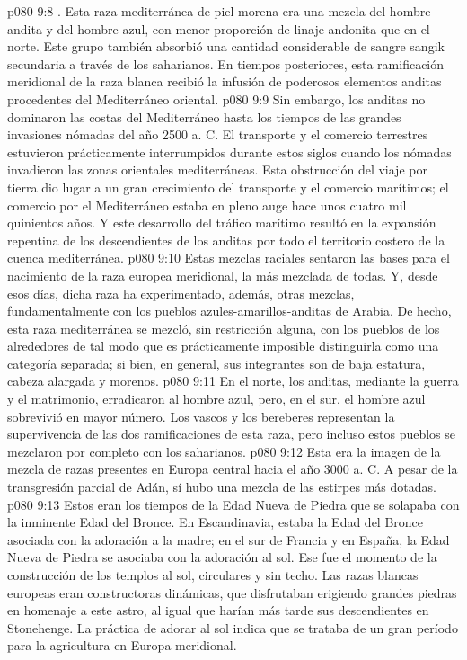 \vs p080 9:8 . Esta raza mediterránea de piel morena era una mezcla del hombre andita y del hombre azul, con menor proporción de linaje andonita que en el norte. Este grupo también absorbió una cantidad considerable de sangre sangik secundaria a través de los saharianos. En tiempos posteriores, esta ramificación meridional de la raza blanca recibió la infusión de poderosos elementos anditas procedentes del Mediterráneo oriental.
\vs p080 9:9 Sin embargo, los anditas no dominaron las costas del Mediterráneo hasta los tiempos de las grandes invasiones nómadas del año 2500 a. C. El transporte y el comercio terrestres estuvieron prácticamente interrumpidos durante estos siglos cuando los nómadas invadieron las zonas orientales mediterráneas. Esta obstrucción del viaje por tierra dio lugar a un gran crecimiento del transporte y el comercio marítimos; el comercio por el Mediterráneo estaba en pleno auge hace unos cuatro mil quinientos años. Y este desarrollo del tráfico marítimo resultó en la expansión repentina de los descendientes de los anditas por todo el territorio costero de la cuenca mediterránea.
\vs p080 9:10 Estas mezclas raciales sentaron las bases para el nacimiento de la raza europea meridional, la más mezclada de todas. Y, desde esos días, dicha raza ha experimentado, además, otras mezclas, fundamentalmente con los pueblos azules\hyp{}amarillos\hyp{}anditas de Arabia. De hecho, esta raza mediterránea se mezcló, sin restricción alguna, con los pueblos de los alrededores de tal modo que es prácticamente imposible distinguirla como una categoría separada; si bien, en general, sus integrantes son de baja estatura, cabeza alargada y morenos.
\vs p080 9:11 En el norte, los anditas, mediante la guerra y el matrimonio, erradicaron al hombre azul, pero, en el sur, el hombre azul sobrevivió en mayor número. Los vascos y los bereberes representan la supervivencia de las dos ramificaciones de esta raza, pero incluso estos pueblos se mezclaron por completo con los saharianos.
\vs p080 9:12 \pc Esta era la imagen de la mezcla de razas presentes en Europa central hacia el año 3000 a. C. A pesar de la transgresión parcial de Adán, sí hubo una mezcla de las estirpes más dotadas.
\vs p080 9:13 \pc Estos eran los tiempos de la Edad Nueva de Piedra que se solapaba con la inminente Edad del Bronce. En Escandinavia, estaba la Edad del Bronce asociada con la adoración a la madre; en el sur de Francia y en España, la Edad Nueva de Piedra se asociaba con la adoración al sol. Ese fue el momento de la construcción de los templos al sol, circulares y sin techo. Las razas blancas europeas eran constructoras dinámicas, que disfrutaban erigiendo grandes piedras en homenaje a este astro, al igual que harían más tarde sus descendientes en Stonehenge. La práctica de adorar al sol indica que se trataba de un gran período para la agricultura en Europa meridional.
